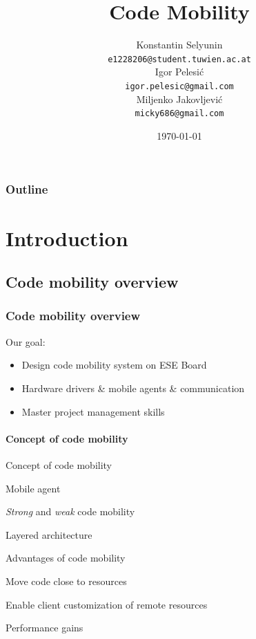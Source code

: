 \documentclass{beamer}
\title[Code Mobility]{Code Mobility}
\date{\today}
\author[Selyunin,Pelesi\'c,Jakovljevi\'c]{
 \Large{Konstantin Selyunin}\\
  \small{\texttt{e1228206@student.tuwien.ac.at}}\\
 \Large{Igor Pelesi\'c}\\
  \small{\texttt{igor.pelesic@gmail.com}}\\
 \Large{Miljenko Jakovljevi\'c}\\
  \small{\texttt{micky686@gmail.com}}\\
}
\theoremstyle{definition} \newtheorem{mdefinition}{Definition}
\theoremstyle{plain} \newtheorem{mtheorem}{Theorem}
\theoremstyle{plain} \newtheorem{mcorollary}{Corollary}
\theoremstyle{plain} \newtheorem{mfact}{Fact}
\begin{document}
\begin{frame}
	\titlepage
\end{frame}

\begin{frame}
	\frametitle{Outline}
	\tableofcontents
\end{frame}

\section{Introduction}


\subsection{Code mobility overview}
\begin{frame}
	\frametitle{Code mobility overview}
	Our goal:
	\begin{itemize}
		\item Design code mobility system on ESE Board
		\item Hardware drivers \& mobile agents \& communication
		\item Master project management skills
	\end{itemize}

 		\framesubtitle{Concept of code mobility}
	\begin{block}{Concept of code mobility}
		\begin{description}
			\item	Mobile agent
			\item	{\it Strong} and {\it weak} code mobility
			\item   Layered architecture
		\end{description}
	\end{block}

	\begin{block}{Advantages of code mobility}
		\begin{description}
			\item	Move code close to resources 
			\item	Enable client customization of remote resources
			\item	Performance gains
		\end{description}
	\end{block}	

\end{frame}
\end{document}
